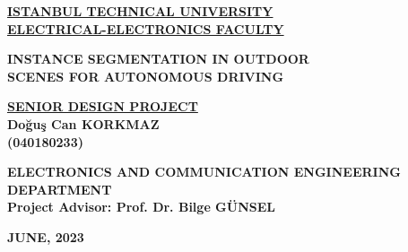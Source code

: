 \documentclass[12pt,a4paper]{report}
\begin{document}
\begin{titlepage}
   \begin{center}  
   \underline{\textbf{ISTANBUL TECHNICAL UNIVERSITY}}\\     
   \underline{\textbf{ELECTRICAL-ELECTRONICS FACULTY}}\\
       
    \vspace*{3cm}
    

    \textbf{INSTANCE SEGMENTATION IN OUTDOOR}\\
    \textbf{SCENES FOR AUTONOMOUS DRIVING}\\
   
    
    \vspace{3cm}
    
    
    \underline{\textbf{SENIOR DESIGN PROJECT}}\\
    \vspace{1cm}
    \textbf{Doğuş Can KORKMAZ} \\
    \textbf{(040180233)} \\
    
    
    
    \vspace{6.5cm}
        
    \textbf{ELECTRONICS AND COMMUNICATION ENGINEERING}\\ \textbf{DEPARTMENT}\\
    
    \vspace{2cm}
    \textbf{Project Advisor: Prof. Dr. Bilge GÜNSEL}\\
     

           \vfill 

       \textbf{JUNE, 2023}
            
   \end{center}
\end{titlepage}
\end{document}

